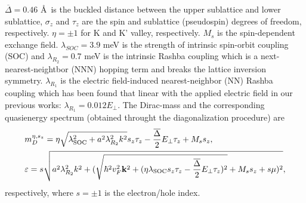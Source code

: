 \documentclass[UTF8,a4paper]{article}
\begin{document}
\begin{large}
$\overline{\Delta}=0.46$ \AA\ is the buckled distance between the upper sublattice and lower sublattice,
$\sigma_{z}$ and $\tau_{z}$ are the spin and sublattice (pseudospin) degrees of freedom, respectively.
$\eta=\pm 1$ for K and K' valley, respectively.
$M_{s}$ is the spin-dependent exchange field. 
$\lambda_{SOC}=3.9$ meV is the strength of intrinsic spin-orbit coupling (SOC) and $\lambda_{R_{2}}=0.7$ meV is the intrinsic Rashba coupling
which is a next-nearest-neightbor (NNN) hopping term and breaks the lattice inversion symmetry.
$\lambda_{R_{1}}$ is the electric field-induced nearest-neighbor (NN) Rashba coupling which has been found that linear with the applied electric field
in our previous works\cite{Wu C H1}: $\lambda_{R_{1}}=0.012E_{\perp}$.
The Dirac-mass and the corresponding quasienergy spectrum (obtained throught the diagonalization procedure) are\cite{Wu C HX,XX,Wu C H_3}
\begin{equation} 
\begin{aligned}
&m_{D}^{\eta,s_{z}}=\eta\sqrt{\lambda_{{\rm SOC}}^{2}+a^{2}\lambda^{2}_{R_{2}}k^{2}}s_{z}\tau_{z}-\frac{\overline{\Delta}}{2}E_{\perp}\tau_{z}+M_{s}s_{z},\\
&\varepsilon=s\sqrt{a^{2}\lambda^{2}_{R_{2}}k^{2}+(\sqrt{\hbar^{2}v_{F}^{2}{\bf k}^{2}
+(\eta\lambda_{{\rm SOC}}s_{z}\tau_{z}-\frac{\overline{\Delta}}{2}E_{\perp}\tau_{z} )^{2}}+M_{s}s_{z}+s\mu)^{2}},
\end{aligned}
\end{equation}
respectively, 
where $s=\pm 1$ is the electron/hole index.

\end{large}
\end{document}
